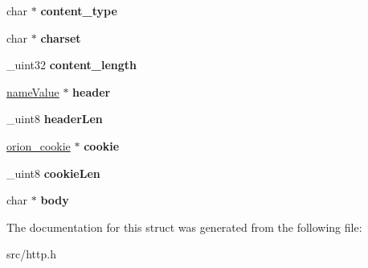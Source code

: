\begin{DoxyCompactItemize}
\item 
\hypertarget{structorion__httpResponse_a734f987d6f2823800d0b6a2a9bb2d26a}{
char $\ast$ {\bfseries content\_\-type}}
\label{structorion__httpResponse_a734f987d6f2823800d0b6a2a9bb2d26a}

\item 
\hypertarget{structorion__httpResponse_a53126c4ea065b647fe1115ef35d7028d}{
char $\ast$ {\bfseries charset}}
\label{structorion__httpResponse_a53126c4ea065b647fe1115ef35d7028d}

\item 
\hypertarget{structorion__httpResponse_a2b8ff190c94e8e1b5e61d4905b21a28c}{
\_\-uint32 {\bfseries content\_\-length}}
\label{structorion__httpResponse_a2b8ff190c94e8e1b5e61d4905b21a28c}

\item 
\hypertarget{structorion__httpResponse_a45c1160f05035286bc499eddda03be68}{
\hyperlink{structnameValue}{nameValue} $\ast$ {\bfseries header}}
\label{structorion__httpResponse_a45c1160f05035286bc499eddda03be68}

\item 
\hypertarget{structorion__httpResponse_a5c760fb95aca110d0561fac710de3509}{
\_\-uint8 {\bfseries headerLen}}
\label{structorion__httpResponse_a5c760fb95aca110d0561fac710de3509}

\item 
\hypertarget{structorion__httpResponse_ae687f288a074e0fa0e6f9ca6e44991e1}{
\hyperlink{structorion__cookie}{orion\_\-cookie} $\ast$ {\bfseries cookie}}
\label{structorion__httpResponse_ae687f288a074e0fa0e6f9ca6e44991e1}

\item 
\hypertarget{structorion__httpResponse_a3ad10dbd47b57b04729706ca96a9d2fe}{
\_\-uint8 {\bfseries cookieLen}}
\label{structorion__httpResponse_a3ad10dbd47b57b04729706ca96a9d2fe}

\item 
\hypertarget{structorion__httpResponse_a8e5d8dbe1389410747dd858b7be77128}{
char $\ast$ {\bfseries body}}
\label{structorion__httpResponse_a8e5d8dbe1389410747dd858b7be77128}

\end{DoxyCompactItemize}


The documentation for this struct was generated from the following file:\begin{DoxyCompactItemize}
\item 
src/http.h\end{DoxyCompactItemize}
